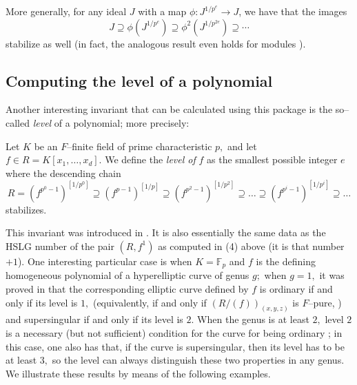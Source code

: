 \documentclass{amsart}
\begin{document}

More generally, for any ideal $J$ with a map $\phi : J^{1/p^e} \to J$, we have that the images
\[
J \supseteq \phi(J^{1/p^e}) \supseteq \phi^2(J^{1/p^{2e}}) \supseteq \cdots
\]
stabilize as well (in fact, the analogous result even holds for modules \cite{Gabber.tStruc}).


\subsection{Computing the level of a polynomial}
Another interesting invariant that can be calculated using this package
is the so--called \emph{level} of a polynomial; more precisely:

\begin{definition}
Let $K$ be an $F$--finite field of prime characteristic $p,$ and let
$f\in R=K[x_1,\ldots, x_d].$ We define the \emph{level of} $f$ as the
smallest possible integer $e$ where the descending chain
\[
R=(f^{p^0-1})^{[1/p^0]}\supseteq (f^{p-1})^{[1/p]}\supseteq
(f^{p^2-1})^{[1/p^2]}\supseteq\ldots%
\supseteq (f^{p^i-1})^{[1/p^i]}\supseteq\ldots
\]
stabilizes.
\end{definition}
This invariant was introduced in \cite{AlvarezBlickleLyubeznik2005}.  It is also essentially the same data as the HSLG number of the pair $(R, f^1)$ as computed in (4) above (it is that number $+1$).
One interesting particular
case is when $K=\mathbb{F}_p$ and $f$ is the defining homogeneous polynomial of a hyperelliptic curve
of genus $g;$ when $g=1,$ it was proved in
\cite{BoixDeStefaniVanzo2015} that the corresponding elliptic curve defined by $f$
is ordinary if and only if its level is $1,$ (equivalently, if and only if
$(R/(f))_{(x,y,z)}$ is $F$--pure, %
) and supersingular if and only if its level is $2.$ When
the genus is at least $2,$ level $2$ is a necessary (but not sufficient) condition for the curve
for being ordinary \cite{BlancoBoixFordhamYilmaz2018}; in this case, one also
has that, if the curve is supersingular, then its level has to be at least $3,$ so the level can
always distinguish these two properties in any genus. We illustrate these results by means
of the following examples.
\end{document}
